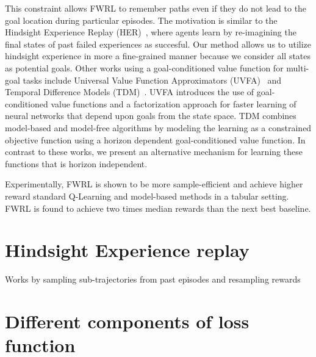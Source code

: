 This constraint allows FWRL to remember paths even if they do not lead
to the goal location during particular episodes. The motivation is
similar to the Hindsight Experience Replay
(HER)~\citep{anderson2017vision}, where agents learn by re-imagining the
final states of past failed experiences as succesful. Our method allows
us to utilize hindsight experience in more a fine-grained manner because
we consider all states as potential goals. Other works using a
goal-conditioned value function for multi-goal tasks include Universal
Value Function Approximators (UVFA)~\citep{schaul2015universal} and
Temporal Difference Models (TDM)~\citep{pong2018temporal}. UVFA
introduces the use of goal-conditioned value functions and a
factorization approach for faster learning of neural networks that
depend upon goals from the state space.  TDM combines model-based and
model-free algorithms by modeling the learning as a constrained
objective function using a horizon dependent goal-conditioned value
function. In contrast to these works, we present an alternative
mechanism for learning these functions that is horizon independent.  

Experimentally, FWRL is shown to be more sample-efficient and achieve higher
reward standard Q-Learning and model-based methods in a tabular setting. FWRL is
found to achieve two times median rewards than the next best baseline.




\section{Hindsight Experience replay}

Works by sampling sub-trajectories from past episodes and resampling rewards

\section{Different components of loss function}
